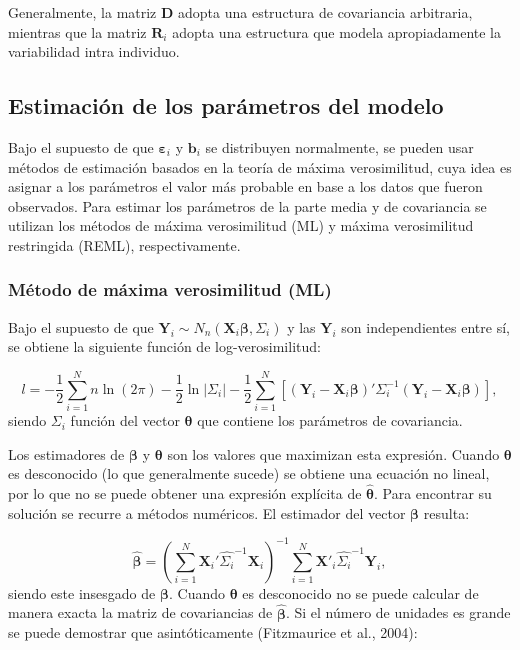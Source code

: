 \documentclass[spanish]{article}
\numberwithin{figure}{subsection}
\numberwithin{equation}{subsection}
\numberwithin{table}{subsection}
\begin{document}
Generalmente, la matriz $\bm{D}$ adopta una estructura de covariancia
arbitraria, mientras que la matriz $\bm{R}_i$ adopta una estructura que modela
apropiadamente la variabilidad intra individuo.

\subsection{Estimación de los parámetros del modelo}

Bajo el supuesto de que $\bm{\varepsilon}_i$ y $\bm{b}_i$ se distribuyen
normalmente, se pueden usar métodos de estimación basados en la teoría de máxima
verosimilitud, cuya idea es asignar a los parámetros el valor más probable en
base a los datos que fueron observados. Para estimar los parámetros de la parte
media y de covariancia se utilizan los métodos de máxima verosimilitud (ML) y
máxima verosimilitud restringida (REML), respectivamente.

\subsubsection{Método de máxima verosimilitud (ML)}

Bajo el supuesto de que $\bm{Y}_i \sim N_n(\bm{X}_i \bm{\beta},
\bm{\varSigma}_i)$ y las $\bm{Y}_i$
son independientes entre sí, se obtiene la siguiente función de
log-verosimilitud:

\begin{equation}
\label{ML}
	l = -\frac{1}{2} \sum_{i=1}^{N}n \ln(2\pi) - \frac{1}{2}\ln|\bm{\varSigma}_i| -
	\frac{1}{2} \sum_{i=1}^{N} [(\bm{Y}_i - \bm{X}_i\bm{\beta})'
	\bm{\varSigma}_i^{-1} (\bm{Y}_i - \bm{X}_i\bm{\beta})],
\end{equation}
siendo $\bm{\varSigma}_i$ función del vector $\bm{\theta}$ que contiene los
parámetros de covariancia.

Los estimadores de $\bm{\beta}$ y $\bm{\theta}$ son los valores que maximizan
esta expresión. Cuando $\bm{\theta}$ es desconocido (lo que generalmente sucede)
se obtiene una ecuación no lineal, por lo que no se puede obtener una expresión
explícita de $\hat{\bm{\theta}}$. Para encontrar su solución se recurre a
métodos numéricos. El estimador del vector $\bm{\beta}$ resulta:

\[ \hat{\bm{\beta}} = (\sum_{i=1}^{N} \bm{X}_i'\hat{\bm{\varSigma}_i}^{-1}\bm{X}_i)^{-1}
\sum_{i=1}^{N} \bm{X}'_i\hat{\bm{\varSigma}_i}^{-1}\bm{Y}_i, \]
siendo este insesgado de $\bm{\beta}$. Cuando $\bm{\theta}$ es desconocido no se
puede calcular de manera exacta la matriz de covariancias de $\hat{\bm{\beta}}$.
Si el número de unidades es grande se puede demostrar que asintóticamente
(Fitzmaurice et al., 2004):
\end{document}
